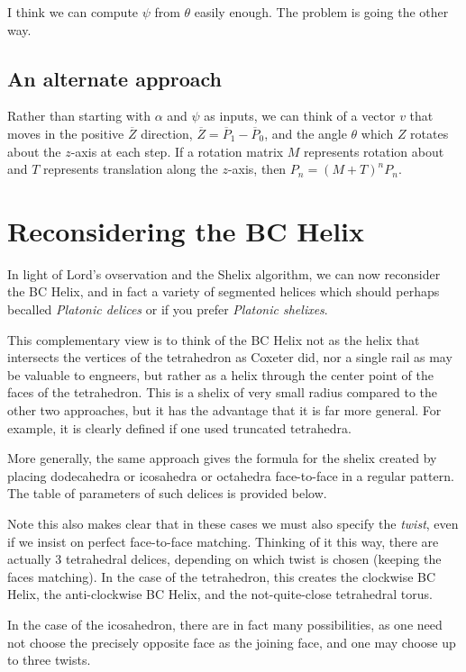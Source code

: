 \documentclass[11pt]{article}
\begin{document}
{I think we can compute $\psi$ from $\theta$ easily enough. The problem is going the other way.

\subsection{An alternate approach}

Rather than starting with $\alpha$ and $\psi$ as inputs, we can think of a vector $v$ that
moves in the positive $\overline Z$ direction, $\overline Z = \overline P_1 - \overline P_0$, and
the angle $\theta$ which $Z$ rotates about the $z$-axis at each step. If a rotation matrix $M$
represents rotation about and $T$ represents translation along the $z$-axis, then $P_n = (M+T)^nP_n$.

\section{Reconsidering the BC Helix}

In light of Lord's ovservation and the Shelix algorithm, we can now
reconsider the BC Helix, and in fact a variety of segmented helices which
should perhaps becalled {\em Platonic delices} or if you prefer {\em Platonic shelixes}.

This complementary view is to think of the BC Helix not as the helix that
intersects the vertices of the tetrahedron as Coxeter did\cite{coxeter1985simplicial}, nor a single
rail as may be valuable to engneers\cite{read2018transforming}, but rather as a helix through
the center point of the faces of the tetrahedron. This is a shelix of
very small radius compared to the other two approaches, but it has
the advantage that it is far more general. For example, it is
clearly defined if one used truncated tetrahedra.

More generally, the same approach gives the formula for the shelix
created by placing dodecahedra or icosahedra or octahedra face-to-face
in a regular pattern. The table of parameters of such delices is provided
below.

Note this also makes clear that in these cases we must also specify the {\em twist},
even if we insist on perfect face-to-face matching. Thinking of it this
way, there are actually 3 tetrahedral delices, depending on which twist
is chosen (keeping the faces matching). In the case of the tetrahedron,
this creates the clockwise BC Helix, the anti-clockwise BC Helix, and the
not-quite-close tetrahedral torus.

In the case of the icosahedron, there are in fact many possibilities,
as one need not choose the precisely opposite face as the joining face, and
one may choose up to three twists.

}
\end{document}

